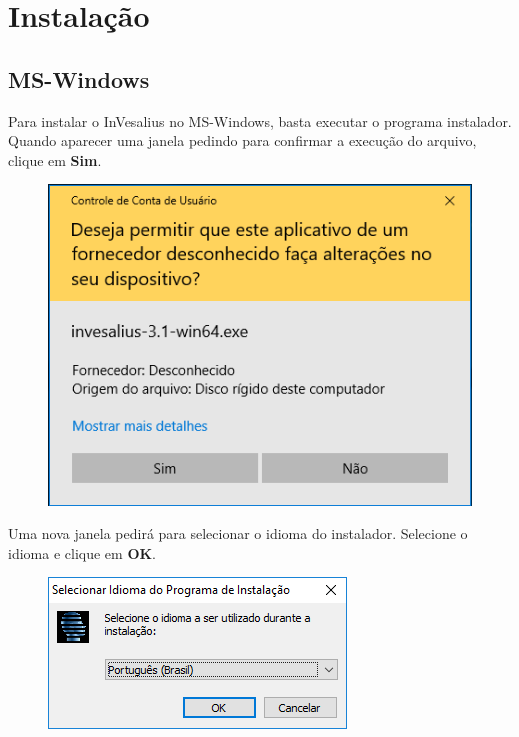 \chapter{Instalação}

\section{MS-Windows}

Para instalar o InVesalius no MS-Windows, basta executar o programa instalador.
Quando aparecer uma janela pedindo para confirmar a execução do arquivo, clique
em \textbf{Sim}.

\begin{figure}[!htb]
\centering
\includegraphics[scale=0.5]{../user_guide_figures/invesalius_screen/installation_exec_pt.png}
\end{figure}

\newpage
Uma nova janela pedirá para selecionar o idioma do instalador. Selecione
o idioma e clique em \textbf{OK}.

\begin{figure}[!htb]
\centering
\includegraphics[scale=0.7]{../user_guide_figures/invesalius_screen/installation_select_language_pt.png}
\end{figure}
 
